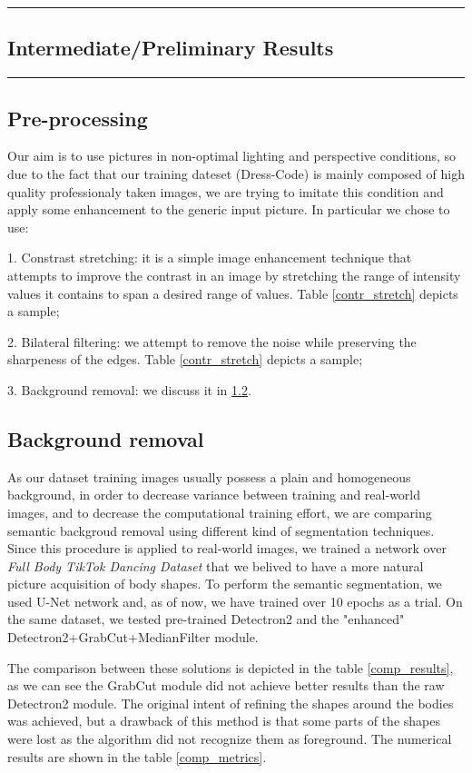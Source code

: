 {\color{gray}\hrule}
\begin{center}
\section{Intermediate/Preliminary Results}
\end{center}

{\color{gray}\hrule}


\begin{multicols}{2}

\subsection{Pre-processing}
Our aim is to use pictures in non-optimal lighting and perspective conditions, so due to the fact that our training dateset (Dress-Code) is mainly composed of high quality professionaly taken images, we are trying to imitate this condition and apply some enhancement to the generic input picture. In particular we chose to use:

1. Constrast stretching: it is a simple image enhancement technique that attempts to improve the contrast in an image by stretching the range of intensity values it contains to span a desired range of values. Table \ref{contr_stretch} depicts a sample;

2. Bilateral filtering: we attempt to remove the noise while preserving the sharpeness of the edges. Table \ref{contr_stretch} depicts a sample;

3. Background removal: we discuss it in \ref{back_rem}.


\subsection{Background removal}\label{back_rem}
As our dataset training images usually possess a plain and homogeneous background, in order to decrease variance between training and real-world images, and to decrease the computational training effort, we are comparing semantic backgroud removal using different kind of segmentation techniques. Since this procedure is applied to real-world images, we trained a network over \textit{Full Body TikTok Dancing Dataset}\cite{tik_tok_dataset} that we belived to have a more natural picture acquisition of body shapes. To perform the semantic segmentation, we used U-Net network and, as of now, we have trained over 10 epochs as a trial. On the same dataset, we tested pre-trained Detectron2 and the "enhanced" Detectron2+GrabCut+MedianFilter module.	

The comparison between these solutions is depicted in the table \ref{comp_results}, as we can see the GrabCut module did not achieve better results than the raw Detectron2 module. The original intent of refining the shapes around the bodies was achieved, but a drawback of this method is that some parts of the shapes were lost as the algorithm did not recognize them as foreground. The numerical results are shown in the table \ref{comp_metrics}.

\end{multicols}


